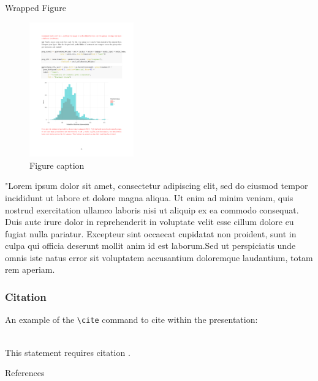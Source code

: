 \documentclass[aspectratio=169,xcolor=dvipsnames, t]{beamer}
\begin{document}
\begin{frame}{Wrapped Figure}
    \begin{figure}
    \centering
    \includegraphics[width=0.4\textwidth]{figures/results_fig.pdf}
    \caption{Figure caption}
\end{figure}
"Lorem ipsum dolor sit amet, consectetur adipiscing elit, sed do eiusmod tempor incididunt ut labore et dolore magna aliqua. Ut enim ad minim veniam, quis nostrud exercitation ullamco laboris nisi ut aliquip ex ea commodo consequat. Duis aute irure dolor in reprehenderit in voluptate velit esse cillum dolore eu fugiat nulla pariatur. Excepteur sint occaecat cupidatat non proident, sunt in culpa qui officia deserunt mollit anim id est laborum.Sed ut perspiciatis unde omnis iste natus error sit voluptatem accusantium doloremque laudantium, totam rem aperiam.
\end{frame}

\begin{frame}[fragile] %
    \frametitle{Citation}
    An example of the \verb|\cite| command to cite within the presentation:\\~

    This statement requires citation \cite{p1}.
\end{frame}

\begin{frame}{References}


\end{frame}

\makefinalpage
\end{document}
